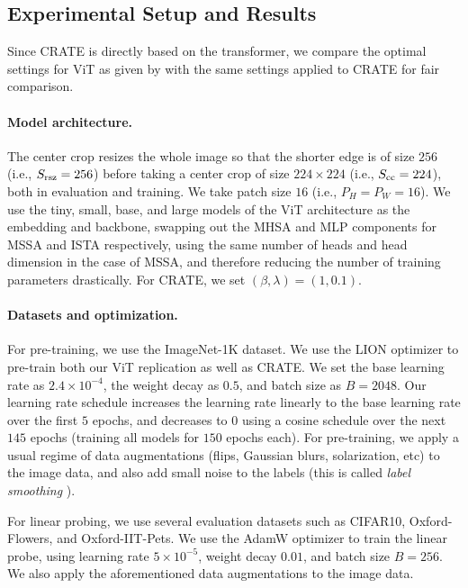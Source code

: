 \documentclass[\toplevelprefix/book-main.tex]{subfiles}
\begin{document}
\subsection{Experimental Setup and Results}\label{sub:image_classification_experiments}

Since CRATE is directly based on the transformer, we compare the optimal settings for ViT as given by \cite{dosovitskiy2020image,touvron2020training} with the same settings applied to CRATE for fair comparison.

\paragraph{Model architecture.} The center crop resizes the whole image so that the shorter edge is of size \(256\) (i.e., \(S_{\mathrm{rsz}} = 256\)) before taking a center crop of size \(224 \times 224\) (i.e., \(S_{\mathrm{cc}} = 224\)), both in evaluation and training. We take patch size \(16\) (i.e., \(P_{H} = P_{W} = 16\)). We use the tiny, small, base, and large models of the ViT \cite{dosovitskiy2020image} architecture as the embedding and backbone, swapping out the MHSA and MLP components for MSSA and ISTA respectively, using the same number of heads and head dimension in the case of MSSA, and therefore reducing the number of training parameters drastically. For CRATE, we set \((\beta, \lambda) = (1, 0.1)\).

\paragraph{Datasets and optimization.} For pre-training, we use the ImageNet-1K dataset. We use the LION optimizer \citep{chen2024symbolic} to pre-train both our ViT replication as well as CRATE. We set the base learning rate as \(2.4 \times 10^{-4}\), the weight decay as \(0.5\), and batch size as \(B = 2048\). Our learning rate schedule increases the learning rate linearly to the base learning rate over the first \(5\) epochs, and decreases to \(0\) using a cosine schedule over the next \(145\) epochs (training all models for \(150\) epochs each). For pre-training, we apply a usual regime of data augmentations (flips, Gaussian blurs, solarization, etc) to the image data, and also add small noise to the labels (this is called \textit{label smoothing} \citep{muller2019does}).

For linear probing, we use several evaluation datasets such as CIFAR10, Oxford-Flowers, and Oxford-IIT-Pets. We use the AdamW optimizer to train the linear probe, using learning rate \(5 \times 10^{-5}\), weight decay \(0.01\), and batch size \(B = 256\). We also apply the aforementioned data augmentations to the image data.
\end{document}
